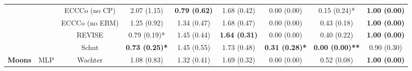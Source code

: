 \begin{table}
{\begin{tabular}[t]{>{}c|c|c|c|c|c|c|c|c}
 &  & ECCCo (no CP) & 2.07 (1.15) & \textbf{0.79 (0.62)} & 1.68 (0.42) & 0.00 (0.00) & 0.15 (0.24)* & \textbf{1.00 (0.00)}\\

 &  & ECCCo (no EBM) & 1.25 (0.92) & 1.34 (0.47) & 1.68 (0.47) & 0.00 (0.00) & 0.43 (0.18) & \textbf{1.00 (0.00)}\\

 &  & REVISE & 0.79 (0.19)* & 1.45 (0.44) & \textbf{1.64 (0.31)} & 0.00 (0.00) & 0.40 (0.22) & \textbf{1.00 (0.00)}\\

 &  & Schut & \textbf{0.73 (0.25)*} & 1.45 (0.55) & 1.73 (0.48) & \textbf{0.31 (0.28)*} & \textbf{0.00 (0.00)**} & 0.90 (0.30)\\

\multirow{-12}{*}{\centering\arraybackslash \textbf{Moons}} & \multirow{-6}{*}{\centering\arraybackslash MLP} & Wachter & 1.08 (0.83) & 1.32 (0.41) & 1.69 (0.32) & 0.00 (0.00) & 0.52 (0.08) & \textbf{1.00 (0.00)}\\
\hline
\end{tabular}}
\end{table}
